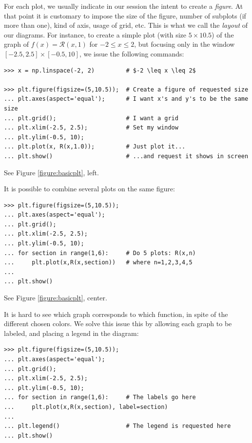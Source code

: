 For each plot, we usually indicate in our session the intent to create a \emph{figure}.  At that point it is customary to impose the size of the figure, number of subplots (if more than one), kind of axis, usage of grid, etc.  This is what we call the \emph{layout} of our diagrams.  For instance, to create a simple plot (with size $5 \times 10.5$) of the graph of $f(x) = \mathcal{R}(x,1)$ for $-2 \leq x \leq 2$, but focusing only in the window $[-2.5,2.5] \times [-0.5, 10]$, we issue the following commands:

\begin{verbatim}
>>> x = np.linspace(-2, 2)         # $-2 \leq x \leq 2$

>>> plt.figure(figsize=(5,10.5));  # Create a figure of requested size
... plt.axes(aspect='equal');      # I want x's and y's to be the same size
... plt.grid();                    # I want a grid
... plt.xlim(-2.5, 2.5);           # Set my window
... plt.ylim(-0.5, 10);
... plt.plot(x, R(x,1.0));         # Just plot it...
... plt.show()                     # ...and request it shows in screen
\end{verbatim}

See Figure \ref{figure:basicplt}, left.

It is possible to combine several plots on the same figure:

\begin{verbatim}
>>> plt.figure(figsize=(5,10.5));
... plt.axes(aspect='equal');  
... plt.grid();
... plt.xlim(-2.5, 2.5);
... plt.ylim(-0.5, 10);
... for section in range(1,6):     # Do 5 plots: R(x,n)
...     plt.plot(x,R(x,section))   # where n=1,2,3,4,5
...
... plt.show()
\end{verbatim}

See Figure \ref{figure:basicplt}, center.

It is hard to see which graph corresponds to which function, in spite of the different chosen colors.  We solve this issue this by allowing each graph to be labeled, and placing a legend in the diagram:

\begin{verbatim}
>>> plt.figure(figsize=(5,10.5));
... plt.axes(aspect='equal');  
... plt.grid();
... plt.xlim(-2.5, 2.5);
... plt.ylim(-0.5, 10);
... for section in range(1,6):     # The labels go here
...     plt.plot(x,R(x,section), label=section)  
...
... plt.legend()                   # The legend is requested here
... plt.show()
\end{verbatim}

